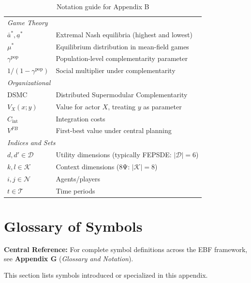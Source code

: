 \begin{table}[h]
\begin{tabular}{p{2.5cm}p{10cm}}
\midrule
\multicolumn{2}{l}{\textit{Game Theory}} \\
$\bar{a}^*, \underline{a}^*$ & Extremal Nash equilibria (highest and lowest) \\
$\mu^*$ & Equilibrium distribution in mean-field games \\
$\gamma^{\text{pop}}$ & Population-level complementarity parameter \\
$1/(1 - \gamma^{\text{pop}})$ & Social multiplier under complementarity \\
\midrule
\multicolumn{2}{l}{\textit{Organizational}} \\
DSMC & Distributed Supermodular Complementarity \\
$V_X(x; y)$ & Value for actor $X$, treating $y$ as parameter \\
$C_{\text{int}}$ & Integration costs \\
$V^{FB}$ & First-best value under central planning \\
\midrule
\multicolumn{2}{l}{\textit{Indices and Sets}} \\
$d, d' \in \mathcal{D}$ & Utility dimensions (typically FEPSDE: $|\mathcal{D}| = 6$) \\
$k, l \in \mathcal{K}$ & Context dimensions (8Ψ: $|\mathcal{K}| = 8$) \\
$i, j \in \mathcal{N}$ & Agents/players \\
$t \in \mathcal{T}$ & Time periods \\
\bottomrule
\end{tabular}
\caption{Notation guide for Appendix B}
\label{tab:notation}
\end{table}



\section{Glossary of Symbols}
\label{sec:B-glossary}

\begin{tcolorbox}[colback=blue!5!white, colframe=blue!75!black]
\textbf{Central Reference:} For complete symbol definitions across the EBF 
framework, see \textbf{Appendix G} (\textit{Glossary and Notation}).

This section lists symbols introduced or specialized in this appendix.
\end{tcolorbox}


